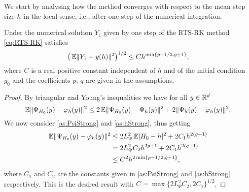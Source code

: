 \documentclass[10pt]{article}
\begin{document}
We start by analysing how the method converges with respect to the mean step size $h$ in the local sense, i.e., after one step of the numerical integration.
\begin{lemma}\label{thm:StrongOrderLocal} Under  the numerical solution $Y_1$ given by one step of the RTS-RK method \eqref{eq:RTS-RK} satisfies 
	\begin{equation}\label{eq:StrongOrderLocal}
		\big(\operatorname{\mathbb{E}}\lVert Y_1 - y(h)\rVert^2\big)^{1/2} \leq C h^{\min\{p+1/2, q + 1\}},
	\end{equation}
	where $C$ is a real positive constant independent of $h$ and of the initial condition $y_0$ and the coefficients $p$, $q$ are given in the assumptions.
\end{lemma}
\begin{proof} By triangular and Young's inequalities we have for all $y \in \mathbb{R}^d$ 
	\begin{equation}
		\operatorname{\mathbb{E}}\lVert\Psi_{H_0}(y) - \varphi_h(y)\rVert^2 \leq 2\operatorname{\mathbb{E}}\lVert\Psi_{H_0}(y) - \Psi_h(y)\rVert^2 + 2\lVert\Psi_h(y) - \varphi_h(y)\rVert^2.
	\end{equation}		
	We now consider \cref{as:PsiStrong} and \cref{as:hStrong}, thus getting
	\begin{equation}\label{eq:LocalErrorDecomposition}
	\begin{aligned}
		\operatorname{\mathbb{E}}\lVert\Psi_{H_0}(y) - \varphi_h(y)\rVert^2 &\leq 2L_{\Psi}^2 \operatorname{\mathbb{E}}\lvert H_0 - h\rvert^2 + 2C_1 h^{2(q+1)} \\
		&= 2L_{\Psi}^2 C_2 h^{2p+1} + 2 C_1 h^{2(q+1)} \\
		&\leq C^2 h^{2\min\{p+1/2,q+1\}},
	\end{aligned}
	\end{equation}
	where $C_1$ and $C_2$ are the constants given in \cref{as:PsiStrong} and \cref{as:hStrong} respectively. This is the desired result with $C = \max\{2L_{\Psi}^2 C_2, 2 C_1\}^{1/2}$.
\end{proof}
\end{document}
